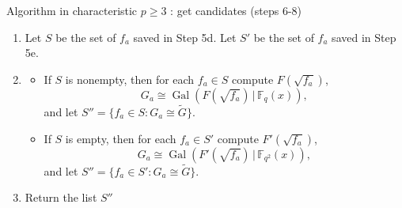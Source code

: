 \documentclass[handout,xcolor=dvipsnames]{beamer}
\theoremstyle{plain}
\newcommand{\wt}[1]{\widetilde{#1}}
\newcommand{\FF}{\mathbb{F}}
\DeclareMathOperator{\Gal}{Gal}
\begin{document}
  \begin{frame}{Algorithm in characteristic $p\geq 3$ : get candidates (steps 6-8)}
    \begin{enumerate}
      \item[6.]
        Let $S$ be the set of $f_a$
        saved in Step 5d.
        Let $S'$ be the set of $f_a$
        saved in Step 5e.
      \item[7.]
        \begin{itemize}
          \item
            If $S$ is nonempty,
            then
            for each $f_a\in S$
            compute
            $F(\sqrt{f_a})$,
            \[
              G_a\cong\Gal(F(\sqrt{f_a})\,|\,\FF_q(x)),
            \]
            and let
            $S''=
            \{f_a\in S:G_a\cong\wt{G}\}$.
          \item
            If $S$ is empty,
            then
            for each $f_a\in S'$
            compute
            $F'(\sqrt{f_a})$,
            \[
              G_a\cong\Gal(F'(\sqrt{f_a})\,|\,\FF_{q^2}(x)),
            \]
            and let
            $S''=
            \{f_a\in S':G_a\cong\wt{G}\}$.
        \end{itemize}
      \item[8.]
        Return the list $S''$
    \end{enumerate}
  \end{frame}
\end{document}
